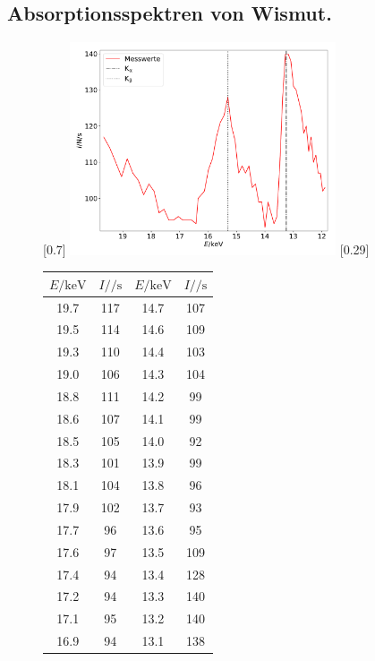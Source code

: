 \subsection{Absorptionsspektren von Wismut.}

\begin{figure}[p]
  \centering
  [0.7\textwidth]{
  \includegraphics[width=0.7\textwidth]{wismut.pdf}
  }
  \hfill
  [0.29\textwidth]{
  \begin{tabular}{c c c c}
    \toprule
    $E / \si{\kilo\electronvolt}$ & $I / \si{\per\second}$ & $E / \si{\kilo\electronvolt}$ & $I / \si{\per\second}$ \\
    \midrule
    19.7 & 117 & 14.7 & 107 \\
    19.5 & 114 & 14.6 & 109 \\
    19.3 & 110 & 14.4 & 103 \\
    19.0 & 106 & 14.3 & 104 \\
    18.8 & 111 & 14.2 & 99 \\
    18.6 & 107 & 14.1 & 99 \\
    18.5 & 105 & 14.0 & 92 \\
    18.3 & 101 & 13.9 & 99 \\
    18.1 & 104 & 13.8 & 96 \\
    17.9 & 102 & 13.7 & 93 \\
    17.7 & 96 & 13.6 & 95 \\
    17.6 & 97 & 13.5 & 109 \\
    17.4 & 94 & 13.4 & 128 \\
    17.2 & 94 & 13.3 & 140 \\
    17.1 & 95 & 13.2 & 140 \\
    16.9 & 94 & 13.1 & 138 \\

\end{tabular}}
\end{figure}
